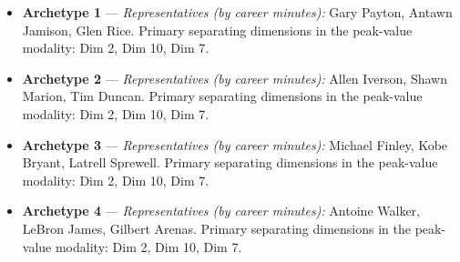 \begin{itemize}
\item \textbf{Archetype 1} --- \emph{Representatives (by career minutes):} Gary Payton, Antawn Jamison, Glen Rice. Primary separating dimensions in the peak-value modality: Dim 2, Dim 10, Dim 7.
\item \textbf{Archetype 2} --- \emph{Representatives (by career minutes):} Allen Iverson, Shawn Marion, Tim Duncan. Primary separating dimensions in the peak-value modality: Dim 2, Dim 10, Dim 7.
\item \textbf{Archetype 3} --- \emph{Representatives (by career minutes):} Michael Finley, Kobe Bryant, Latrell Sprewell. Primary separating dimensions in the peak-value modality: Dim 2, Dim 10, Dim 7.
\item \textbf{Archetype 4} --- \emph{Representatives (by career minutes):} Antoine Walker, LeBron James, Gilbert Arenas. Primary separating dimensions in the peak-value modality: Dim 2, Dim 10, Dim 7.
\end{itemize}
